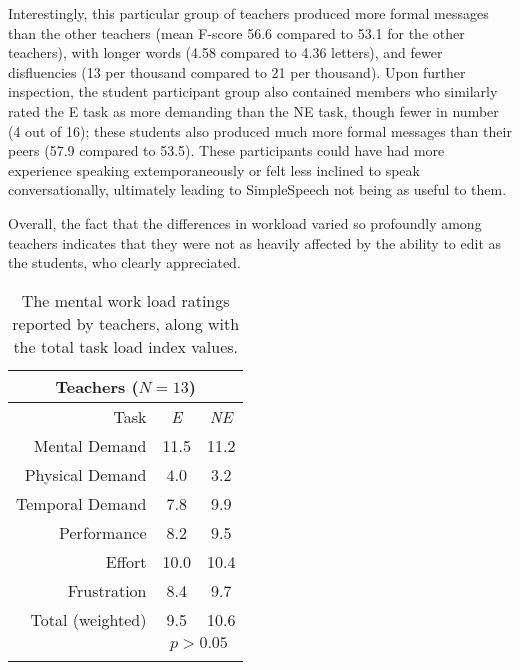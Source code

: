 Interestingly, this particular group of teachers produced more formal messages than the other teachers (mean F-score 56.6 compared to 53.1 for the other teachers), with longer words (4.58 compared to 4.36 letters), and fewer disfluencies (13 per thousand compared to 21 per thousand).
Upon further inspection, the student participant group also contained members who similarly rated the E task as more demanding than the NE task, though fewer in number (4 out of 16); these students also produced much more formal messages than their peers (57.9 compared to 53.5). 
These participants could have had more experience speaking extemporaneously or felt less inclined to speak conversationally, ultimately leading to SimpleSpeech not being as useful to them.

Overall, the fact that the differences in workload varied so profoundly among teachers indicates that they were not as heavily affected by the ability to edit as the students, who clearly appreciated.

\begin{table}
	\centering
	\begin{tabular}{r c c}
		\multicolumn{3}{c}{\textbf{Teachers} ($N=13$)} \\
		\toprule
		Task			& \textit{E} & \textit{NE} \\
		Mental Demand    & 11.5 & 11.2 \\
		Physical Demand  & 4.0  & 3.2  \\
		Temporal Demand  & 7.8  & 9.9  \\
		Performance      & 8.2  & 9.5  \\
		Effort           & 10.0 & 10.4 \\
		Frustration      & 8.4  & 9.7  \\
		\midrule
		Total (weighted) & 9.5  & 10.6 \\
		& \multicolumn{2}{c}{$p>0.05$} \\
		\bottomrule \\
	\end{tabular}
	\caption{The mental work load ratings reported by teachers, along with the total task load index values.}~\label{tab:table2}
\end{table}

